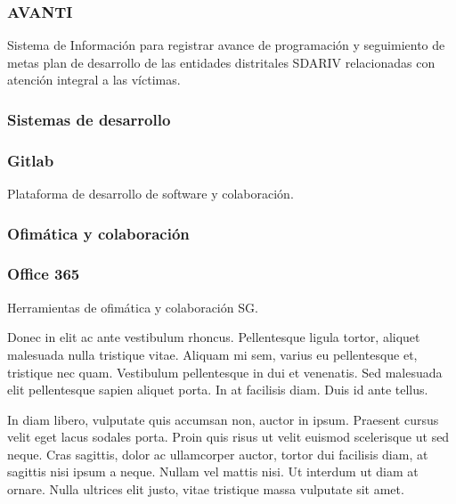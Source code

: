 \documentclass[
	a4paper, %
	12pt, %
]{include/CSSullivanBusinessReport}
\begin{document}
\subsubsection{AVANTI}\label{sec:avanti}

Sistema de Información para registrar avance de programación y
seguimiento de metas plan de desarrollo de las entidades distritales
SDARIV relacionadas con atención integral a las víctimas.

\subsubsection{Sistemas de desarrollo}\label{sec:sistemas-de-desarrollo}

\subsubsection{Gitlab}\label{sec:gitlab}

Plataforma de desarrollo de software y colaboración.

\subsubsection{Ofimática y
colaboración}\label{sec:ofimuxe1tica-y-colaboraciuxf3n}

\subsubsection{Office 365}\label{sec:office-365}

Herramientas de ofimática y colaboración
SG.

Donec in elit ac ante vestibulum rhoncus. Pellentesque ligula tortor, aliquet malesuada nulla tristique vitae. Aliquam mi sem, varius eu pellentesque et, tristique nec quam. Vestibulum pellentesque in dui et venenatis. Sed malesuada elit pellentesque sapien aliquet porta. In at facilisis diam. Duis id ante tellus. %

In diam libero, vulputate quis accumsan non, auctor in ipsum. Praesent cursus velit eget lacus sodales porta. Proin quis risus ut velit euismod scelerisque ut sed neque. Cras sagittis, dolor ac ullamcorper auctor, tortor dui facilisis diam, at sagittis nisi ipsum a neque. Nullam vel mattis nisi. Ut interdum ut diam at ornare. Nulla ultrices elit justo, vitae tristique massa vulputate sit amet.
\end{document}
